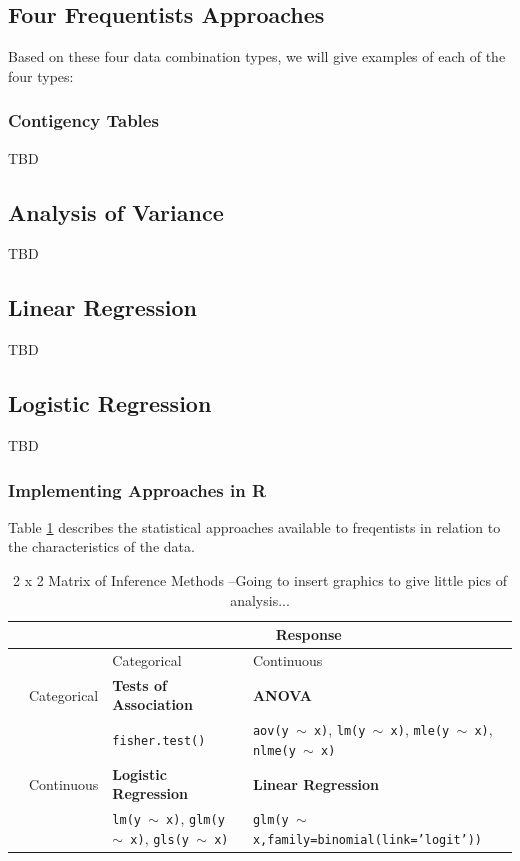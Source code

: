\documentclass{article}\usepackage[]{graphicx}\usepackage[]{color}
\begin{document}
\subsection{Four Frequentists Approaches}

Based on these four data combination types, we will give examples of each of the four types:

\subsubsection{Contigency Tables}

TBD

\subsection{Analysis of Variance}

TBD

\subsection{Linear Regression}

TBD

\subsection{Logistic Regression}

TBD

\subsubsection{Implementing Approaches in R}

Table \ref{tab:2X2Matrix} describes the statistical approaches available to freqentists in relation to the characteristics of the data. 

\begin{table}
	\caption{2 x 2 Matrix of Inference Methods  --Going to insert graphics to give little pics of analysis...}
	\label{tab:2X2Matrix}
	
		\begin{tabular}{|l|l||p{4cm}p{5cm}|} \hline
				&	& \multicolumn{2}{c|}{Response}    \\ \hline
				&			& Categorical 		& Continuous \\ \hline\hline
				
	\parbox[t]{2mm}{} & Categorical 		& \textbf{Tests of Association}	& \textbf{ANOVA} 						\\ 
	&& \texttt{fisher.test()} & \texttt{aov(y $\sim$ x)}, \texttt{lm(y $\sim$ x)}, \texttt{mle(y $\sim$ x)}, \texttt{nlme(y $\sim$ x)}\\
			& Continuous				&	\textbf{Logistic Regression}		& \textbf{Linear Regression}	\\ 
	&& \texttt{lm(y $\sim$ x)}, \texttt{glm(y $\sim$ x)}, \texttt{gls(y $\sim$ x)} & \texttt{glm(y $\sim$ x,family=binomial(link='logit'))}\\ \hline
		\end{tabular}

\end{table}
\end{document}
